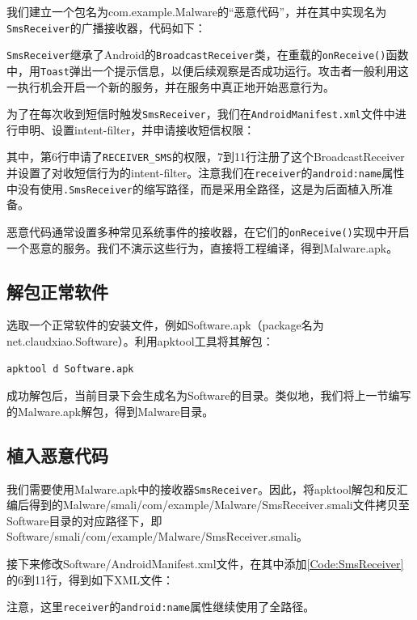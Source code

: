 我们建立一个包名为com.example.Malware的“恶意代码”，并在其中实现名为\lstinline!SmsReceiver!的广播接收器，代码如下：


\lstinline!SmsReceiver!继承了Android的\lstinline!BroadcastReceiver!类，在重载的\lstinline!onReceive()!函数中，用\lstinline!Toast!弹出一个提示信息，以便后续观察是否成功运行。攻击者一般利用这一执行机会开启一个新的服务，并在服务中真正地开始恶意行为。

为了在每次收到短信时触发\lstinline!SmsReceiver!，我们在\lstinline!AndroidManifest.xml!文件中进行申明、设置intent-filter，并申请接收短信权限：

其中，第6行申请了\lstinline!RECEIVER_SMS!的权限，7到11行注册了这个BroadcastReceiver并设置了对收短信行为的intent-filter。注意我们在\lstinline!receiver!的\lstinline!android:name!属性中没有使用\lstinline!.SmsReceiver!的缩写路径，而是采用全路径，这是为后面植入所准备。

恶意代码通常设置多种常见系统事件的接收器，在它们的\lstinline!onReceive()!实现中开启一个恶意的服务。我们不演示这些行为，直接将工程编译，得到Malware.apk。
\subsection{解包正常软件}
选取一个正常软件的安装文件，例如Software.apk（package名为net.claudxiao.Software）。利用apktool工具将其解包：
\begin{lstlisting}[language=bash, numbers=none]
apktool d Software.apk
\end{lstlisting}
成功解包后，当前目录下会生成名为Software的目录。类似地，我们将上一节编写的Malware.apk解包，得到Malware目录。
\subsection{植入恶意代码}
我们需要使用Malware.apk中的接收器\lstinline!SmsReceiver!。因此，将apktool解包和反汇编后得到的Malware/smali/com/example/Malware/SmsReceiver.smali文件拷贝至Software目录的对应路径下，即Software/smali/com/example/Malware/SmsReceiver.smali。

接下来修改Software/AndroidManifest.xml文件，在其中添加\ref{Code:SmsReceiver}的6到11行，得到如下XML文件：

注意，这里\lstinline!receiver!的\lstinline!android:name!属性继续使用了全路径。
